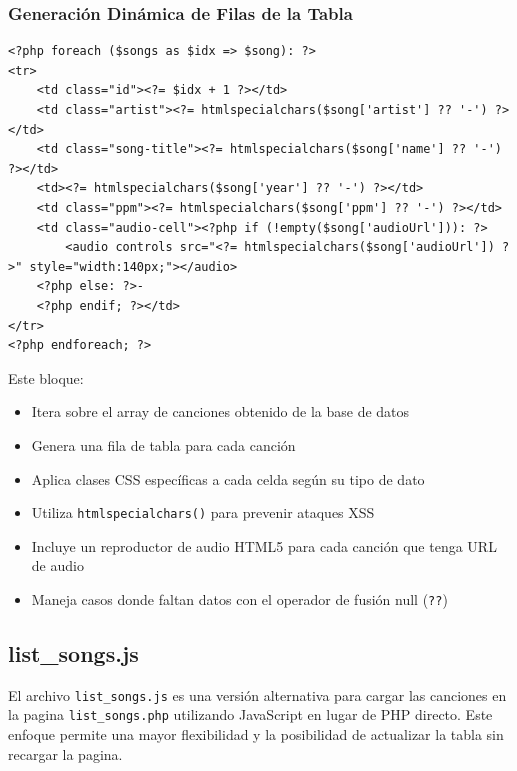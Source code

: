 \documentclass[a4paper,12pt]{article}
\begin{document}
\subsubsection{Generación Dinámica de Filas de la Tabla}
\begin{verbatim}
<?php foreach ($songs as $idx => $song): ?>
<tr>
    <td class="id"><?= $idx + 1 ?></td>
    <td class="artist"><?= htmlspecialchars($song['artist'] ?? '-') ?></td>
    <td class="song-title"><?= htmlspecialchars($song['name'] ?? '-') ?></td>
    <td><?= htmlspecialchars($song['year'] ?? '-') ?></td>
    <td class="ppm"><?= htmlspecialchars($song['ppm'] ?? '-') ?></td>
    <td class="audio-cell"><?php if (!empty($song['audioUrl'])): ?>
        <audio controls src="<?= htmlspecialchars($song['audioUrl']) ?>" style="width:140px;"></audio>
    <?php else: ?>-
    <?php endif; ?></td>
</tr>
<?php endforeach; ?>
\end{verbatim}
Este bloque:
\begin{itemize}
    \item Itera sobre el array de canciones obtenido de la base de datos
    \item Genera una fila de tabla para cada canción
    \item Aplica clases CSS específicas a cada celda según su tipo de dato
    \item Utiliza \texttt{htmlspecialchars()} para prevenir ataques XSS
    \item Incluye un reproductor de audio HTML5 para cada canción que tenga URL de audio
    \item Maneja casos donde faltan datos con el operador de fusión null (\texttt{??})
\end{itemize}

\subsection{list\_songs.js}
El archivo \texttt{list\_songs.js} es una versión alternativa para cargar las canciones en la pagina \texttt{list\_songs.php} utilizando JavaScript en lugar de PHP directo. Este enfoque permite una mayor flexibilidad y la posibilidad de actualizar la tabla sin recargar la pagina.
\end{document}
